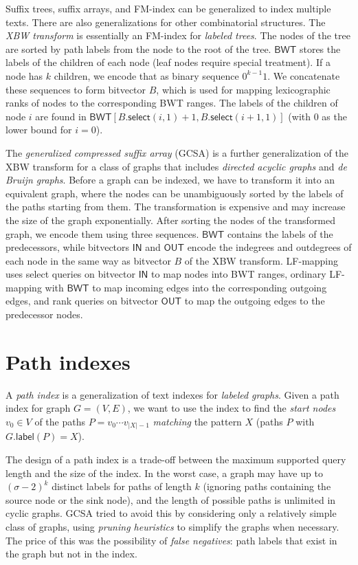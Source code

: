 \documentclass[a4paper,UKenglish]{lipics-v2016}
\newcommand{\abs}[1]{\ensuremath{\lvert #1 \rvert}}
\newcommand{\select}{\ensuremath{\mathsf{select}}}
\newcommand{\glabel}{\ensuremath{\mathsf{label}}}
\newcommand{\LFmapping}{LF\nobreakdash-mapping}
\newcommand{\FMindex}{FM\nobreakdash-index}
\newcommand{\BWT}{\ensuremath{\mathsf{BWT}}}
\newcommand{\bvIN}{\ensuremath{\mathsf{IN}}}
\newcommand{\bvOUT}{\ensuremath{\mathsf{OUT}}}
\begin{document}
Suffix trees, suffix arrays, and \FMindex{} can be generalized to index multiple texts. There are also generalizations for other combinatorial structures. The \emph{XBW transform} \cite{Ferragina2009b} is essentially an \FMindex{} for \emph{labeled trees}. The nodes of the tree are sorted by path labels from the node to the root of the tree. $\BWT$ stores the labels of the children of each node (leaf nodes require special treatment). If a node has $k$ children, we encode that as binary sequence $0^{k-1} 1$. We concatenate these sequences to form bitvector $B$, which is used for mapping lexicographic ranks of nodes to the corresponding BWT ranges. The labels of the children of node $i$ are found in $\BWT[B.\select(i, 1) + 1, B.\select(i + 1, 1)]$ (with $0$ as the lower bound for $i = 0$).

The \emph{generalized compressed suffix array} (GCSA) \cite{Siren2014} is a further generalization of the XBW transform for a class of graphs that includes \emph{directed acyclic graphs} and \emph{de Bruijn graphs}. Before a graph can be indexed, we have to transform it into an equivalent graph, where the nodes can be unambiguously sorted by the labels of the paths starting from them. The transformation is expensive and may increase the size of the graph exponentially. After sorting the nodes of the transformed graph, we encode them using three sequences. $\BWT$ contains the labels of the predecessors, while bitvectors $\bvIN$ and $\bvOUT$ encode the indegrees and outdegrees of each node in the same way as bitvector $B$ of the XBW transform. \LFmapping{} uses select queries on bitvector $\bvIN$ to map nodes into BWT ranges, ordinary \LFmapping{} with $\BWT$ to map incoming edges into the corresponding outgoing edges, and rank queries on bitvector $\bvOUT$ to map the outgoing edges to the predecessor nodes.


\section{Path indexes}

A \emph{path index} is a generalization of text indexes for \emph{labeled graphs}. Given a path index for graph $G = (V, E)$, we want to use the index to find the \emph{start nodes} $v_{0} \in V$ of the paths $P = v_{0} \dotsm v_{\abs{X}-1}$ \emph{matching} the pattern $X$ (paths $P$ with $G.\glabel(P) = X$).

The design of a path index is a trade-off between the maximum supported query length and the size of the index. In the worst case, a graph may have up to $(\sigma-2)^{k}$ distinct labels for paths of length $k$ (ignoring paths containing the source node or the sink node), and the length of possible paths is unlimited in cyclic graphs. GCSA \cite{Siren2014} tried to avoid this by considering only a relatively simple class of graphs, using \emph{pruning heuristics} to simplify the graphs when necessary. The price of this was the possibility of \emph{false negatives}: path labels that exist in the graph but not in the index.
\end{document}
